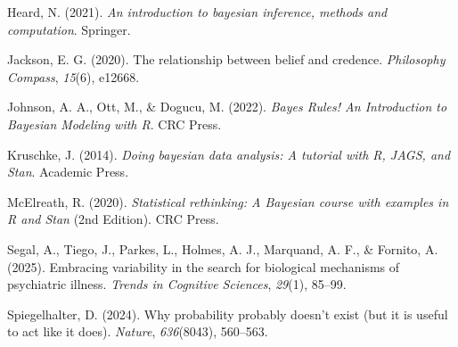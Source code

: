 \documentclass[
  letterpaper,
  DIV=11,
  numbers=noendperiod,
  oneside]{scrreprt}
\newlength{\cslhangindent}
\newenvironment{CSLReferences}[2] %
 {\begin{list}{}{%
  \setlength{\itemindent}{0pt}
  \setlength{\leftmargin}{0pt}
  \setlength{\parsep}{0pt}
  \ifodd #1
   \setlength{\leftmargin}{\cslhangindent}
   \setlength{\itemindent}{-1\cslhangindent}
  \fi
  \setlength{\itemsep}{#2\baselineskip}}}
 {\end{list}}
\theoremstyle{definition}
\theoremstyle{plain}
\theoremstyle{definition}
\theoremstyle{remark}
\begin{document}
\begin{CSLReferences}{1}{0}
Heard, N. (2021). \emph{An introduction to bayesian inference, methods
and computation}. Springer.

Jackson, E. G. (2020). The relationship between belief and credence.
\emph{Philosophy Compass}, \emph{15}(6), e12668.

Johnson, A. A., Ott, M., \& Dogucu, M. (2022). \emph{{Bayes Rules! An
Introduction to Bayesian Modeling with R}}. CRC Press.

Kruschke, J. (2014). \emph{Doing bayesian data analysis: {A} tutorial
with {R}, JAGS, and {Stan}}. Academic Press.

McElreath, R. (2020). \emph{Statistical rethinking: {A} {Bayesian}
course with examples in {R} and {Stan}} (2nd Edition). CRC Press.

Segal, A., Tiego, J., Parkes, L., Holmes, A. J., Marquand, A. F., \&
Fornito, A. (2025). Embracing variability in the search for biological
mechanisms of psychiatric illness. \emph{Trends in Cognitive Sciences},
\emph{29}(1), 85--99.

Spiegelhalter, D. (2024). Why probability probably doesn't exist (but it
is useful to act like it does). \emph{Nature}, \emph{636}(8043),
560--563.

\end{CSLReferences}
\end{document}
